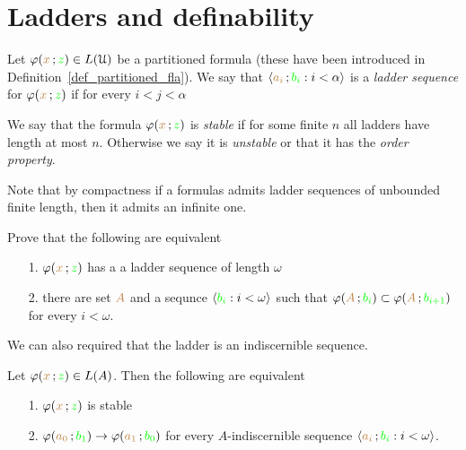 \section{Ladders and definability}



Let $\varphi({\color{brown} x}\,;{\color{green} z})\in L(\EuScript U)$ be a partitioned formula (these have been introduced in Definition~\ref{def_partitioned_fla}).
We say that $\langle{\color{brown}a_i}\,;{\color{green} b_i} : i<\alpha\rangle$ is a \emph{ladder sequence\/} for $\varphi({\color{brown} x}\,;{\color{green} z})$ if for every $i<j<\alpha$



We say that the formula $\varphi({\color{brown} x}\,;{\color{green} z})$ is \emph{stable\/} if for some finite $n$ all ladders have length at most $n$. Otherwise we say it is \emph{unstable} or that it has the \emph{order property}.

Note that by compactness if a formulas admits ladder sequences of unbounded finite length, then it admits an infinite one.

\begin{exercise}
   Prove that the following are equivalent
   \begin{itemize}
   \item[1.]  $\varphi({\color{brown} x}\,;{\color{green} z})$ has a a ladder sequence of length $\omega$
   \item[2.] there are set ${\color{brown} A}$ and a sequnce $\langle{\color{green}b_i} : i<\omega\rangle$ such that $\varphi({\color{brown} A}\,;{\color{green} b_i})\subset\varphi({\color{brown} A}\,;{\color{green} b_{i+1}})$ for every $i<\omega$.
   \end{itemize}
\end{exercise}

We can also required that the ladder is an indiscernible sequence. 

\begin{theorem}\label{thm_sability_indiscernibility}
  Let $\varphi({\color{brown} x}\,;{\color{green} z})\in L(A)$.
  Then the following are equivalent
  \begin{itemize}
    \item[1.] $\varphi({\color{brown} x}\,;{\color{green} z})$ is stable
    \item[2.] $\varphi({\color{brown} a_0}\,;{\color{green} b_1})\rightarrow\varphi({\color{brown} a_1}\,;{\color{green} b_0})$ for every $A$-indiscernible sequence $\langle{\color{brown}a_i}\,;{\color{green} b_i} : i<\omega\rangle$.
  \end{itemize}
\end{theorem}

